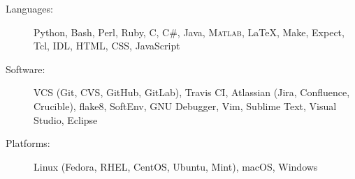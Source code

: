 
\begin{description}
    \item [Languages:] Python, Bash, Perl, Ruby, C, C\#, Java, \textsc{Matlab}, \LaTeX, Make, Expect, Tcl, IDL, HTML, CSS, JavaScript
    \item [Software:]  VCS (Git, CVS, GitHub, GitLab), Travis CI, Atlassian (Jira, Confluence, Crucible), flake8, SoftEnv, GNU Debugger, Vim, Sublime Text, Visual Studio, Eclipse
    \item [Platforms:] Linux (Fedora, RHEL, CentOS, Ubuntu, Mint), macOS, Windows
\end{description}
